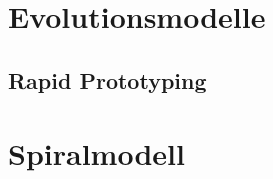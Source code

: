 \documentclass[a4paper, twopage]{scrreprt}
\begin{document}
\chapter{Evolutionsmodelle}

\section{Rapid Prototyping}

\chapter{Spiralmodell}


\nocite{*}
\printbibliography

\listoffigures
\end{document}
